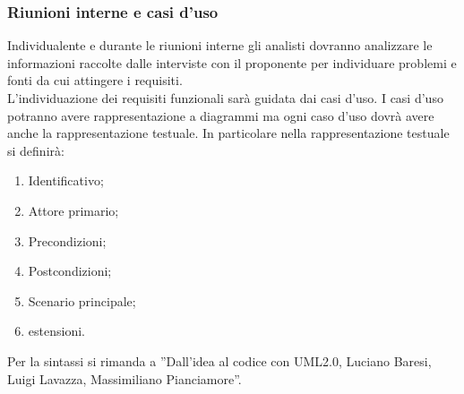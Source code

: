 {{{			\subsubsection{Riunioni interne e casi d'uso}
			Individualente e durante le riunioni interne gli analisti dovranno analizzare le informazioni raccolte dalle interviste con il proponente per individuare problemi e fonti da cui attingere i requisiti.\\
			L’individuazione dei requisiti funzionali sarà guidata dai casi d’uso. I casi d’uso potranno avere rappresentazione a diagrammi ma ogni caso d’uso dovrà avere anche la rappresentazione testuale. In particolare nella rappresentazione testuale si definirà:
			\begin{enumerate}
				\item Identificativo;
				\item Attore primario;
				\item Precondizioni;
				\item Postcondizioni;
				\item Scenario principale;
				\item estensioni.
			\end{enumerate}
			Per la sintassi si rimanda a ”Dall’idea al codice con UML2.0, Luciano Baresi, Luigi Lavazza, Massimiliano Pianciamore”.
			}
}}
